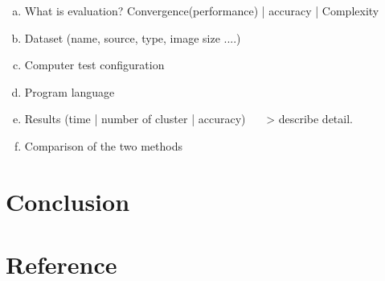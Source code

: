 \documentclass[13pt,a4paper]{report}
\begin{document}
\begin{enumerate}[(a) ]
\item What is evaluation? Convergence(performance) | accuracy | Complexity
\item Dataset (name, source, type, image size ....)
\item Computer test configuration
\item Program language
\item Results (time | number of cluster | accuracy) ~~~> describe detail.
\item Comparison of the two methods
\end{enumerate}
	
	
\section{Conclusion}
\section{Reference}
\end{document}

